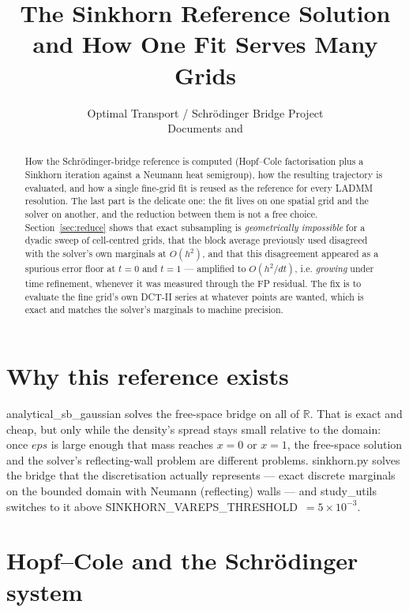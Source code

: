 \documentclass[11pt]{article}
\title{The Sinkhorn Reference Solution\\
and How One Fit Serves Many Grids}
\author{Optimal Transport / Schr\"odinger Bridge Project\\
Documents \code{sinkhorn.py} and \code{study\_utils.reference\_solution}}
\date{}
\newcommand{\eps}{\varepsilon}
\newcommand{\dt}{\Delta t}
\newcommand{\dx}{\Delta x}
\newcommand{\code}[1]{\texttt{#1}}
\def\eps{eps}\def\dt{dt}\def\dx{dx}\def\code#1{#1}%
\begin{document}
\maketitle

\begin{abstract}
How the Schr\"odinger-bridge reference is computed (Hopf--Cole factorisation
plus a Sinkhorn iteration against a Neumann heat semigroup), how the resulting
trajectory is evaluated, and how a single fine-grid fit is reused as the
reference for every LADMM resolution. The last part is the delicate one: the
fit lives on one spatial grid and the solver on another, and the reduction
between them is not a free choice. Section~\ref{sec:reduce} shows that exact
subsampling is \emph{geometrically impossible} for a dyadic sweep of
cell-centred grids, that the block average previously used disagreed with the
solver's own marginals at $O(h^2)$, and that this disagreement appeared as a
spurious error floor at $t=0$ and $t=1$ --- amplified to $O(h^2/\dt)$, i.e.
\emph{growing} under time refinement, whenever it was measured through the FP
residual. The fix is to evaluate the fine grid's own DCT-II series at whatever
points are wanted, which is exact and matches the solver's marginals to
machine precision.
\end{abstract}

\tableofcontents

\section{Why this reference exists}

\code{analytical\_sb\_gaussian} solves the free-space bridge on all of
$\mathbb{R}$. That is exact and cheap, but only while the density's spread
stays small relative to the domain: once $\eps$ is large enough that mass
reaches $x=0$ or $x=1$, the free-space solution and the solver's
reflecting-wall problem are different problems. \code{sinkhorn.py} solves the
bridge that the discretisation actually represents --- exact discrete marginals
on the bounded domain with Neumann (reflecting) walls --- and
\code{study\_utils} switches to it above
\code{SINKHORN\_VAREPS\_THRESHOLD}~$=5\times10^{-3}$.

\section{Hopf--Cole and the Schr\"odinger system}
\end{document}
